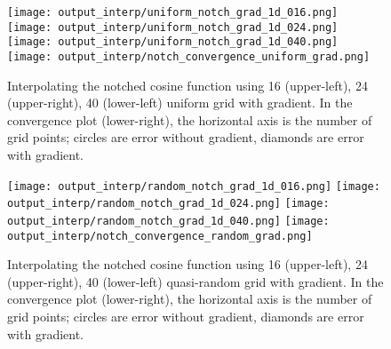 \clearpage
\begin{figure}[tb!] \centering
\texttt{[image: output\_interp/uniform\_notch\_grad\_1d\_016.png]}
\texttt{[image: output\_interp/uniform\_notch\_grad\_1d\_024.png]}
\texttt{[image: output\_interp/uniform\_notch\_grad\_1d\_040.png]}
\texttt{[image: output\_interp/notch\_convergence\_uniform\_grad.png]}
\caption{Interpolating the notched cosine function using 16 (upper-left),
         24 (upper-right), 40 (lower-left) uniform grid with gradient.
         In the convergence plot (lower-right),
         the horizontal axis is the number of grid points;
         circles are error without gradient, diamonds are error with gradient.}
\label{interp_notch_grad_uniform}
\end{figure}

\begin{figure}[tb!] \centering
\texttt{[image: output\_interp/random\_notch\_grad\_1d\_016.png]}
\texttt{[image: output\_interp/random\_notch\_grad\_1d\_024.png]}
\texttt{[image: output\_interp/random\_notch\_grad\_1d\_040.png]}
\texttt{[image: output\_interp/notch\_convergence\_random\_grad.png]}
\caption{Interpolating the notched cosine function using 16 (upper-left),
         24 (upper-right), 40 (lower-left) quasi-random grid with gradient.
         In the convergence plot (lower-right),
         the horizontal axis is the number of grid points;
         circles are error without gradient, diamonds are error with gradient.}
\label{interp_notch_grad_random}
\end{figure}

